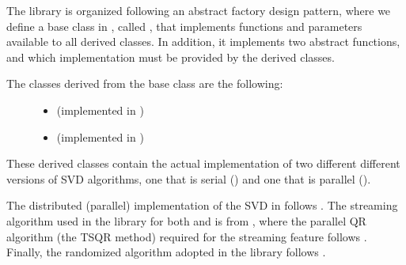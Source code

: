 \documentclass[letterpaper,10pt,english]{sphinxmanual}
\begin{document}
\sphinxAtStartPar
The  library is organized following an abstract factory design pattern, where we define
a base class in , called  {\hyperref[\detokenize{index:parsvd-base-class}]{}}, that implements
functions and parameters available to all derived classes. In addition, it implements two abstract
functions,  and  which implementation must be provided by the
derived classes.
\begin{description}
\item[{The classes derived from the base class are the following:}] \leavevmode\begin{itemize}
\item {} 
\sphinxAtStartPar
{} (implemented in ) {\hyperref[\detokenize{index:module-pyparsvd.parsvd_serial}]{}}

\item {} 
\sphinxAtStartPar
{} (implemented in ) {\hyperref[\detokenize{index:module-pyparsvd.parsvd_parallel}]{}}

\end{itemize}

\end{description}

\sphinxAtStartPar
These derived classes contain the actual implementation of two different different versions
of SVD algorithms, one that is serial () and one that is parallel ().

\sphinxAtStartPar
{}

\sphinxAtStartPar
The distributed (parallel) implementation of the SVD in  follows
.
The streaming algorithm used in the library for both  and 
is from ,
where the parallel QR algorithm (the TSQR method) required for the streaming feature follows
.
Finally, the randomized algorithm adopted in the library follows
.
\end{document}
